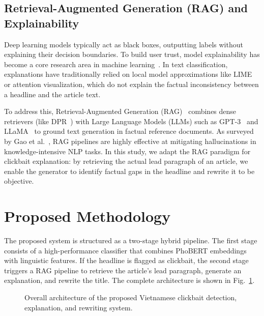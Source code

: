 \documentclass[conference]{IEEEtran}
\begin{document}
\subsection{Retrieval-Augmented Generation (RAG) and Explainability}
Deep learning models typically act as black boxes, outputting labels without explaining their decision boundaries. To build user trust, model explainability has become a core research area in machine learning~\cite{doshi2017towards, ribeiro2016lime}. In text classification, explanations have traditionally relied on local model approximations like LIME~\cite{ribeiro2016lime} or attention visualization, which do not explain the factual inconsistency between a headline and the article text.

To address this, Retrieval-Augmented Generation (RAG)~\cite{lewis2020rag} combines dense retrievers (like DPR~\cite{karpukhin2020dense}) with Large Language Models (LLMs) such as GPT-3~\cite{brown2020gpt3} and LLaMA~\cite{touvron2023llama} to ground text generation in factual reference documents. As surveyed by Gao et al.~\cite{gao2023rag_survey}, RAG pipelines are highly effective at mitigating hallucinations in knowledge-intensive NLP tasks. In this study, we adapt the RAG paradigm for clickbait explanation: by retrieving the actual lead paragraph of an article, we enable the generator to identify factual gaps in the headline and rewrite it to be objective.


\section{Proposed Methodology}
The proposed system is structured as a two-stage hybrid pipeline. The first stage consists of a high-performance classifier that combines PhoBERT embeddings with linguistic features. If the headline is flagged as clickbait, the second stage triggers a RAG pipeline to retrieve the article's lead paragraph, generate an explanation, and rewrite the title. The complete architecture is shown in Fig.~\ref{fig:pipeline}.

\begin{figure}[!ht]
\centering
{}
\caption{Overall architecture of the proposed Vietnamese clickbait detection, explanation, and rewriting system.}
\label{fig:pipeline}
\end{figure}
\end{document}
